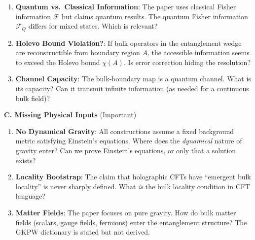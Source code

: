 \documentclass[12pt,a4paper]{article}
\begin{document}
\begin{tcolorbox}[colback=red!5!white, colframe=red!75!black, title=\textbf{RED TEAM Round 6: Foundational Critiques}]
\begin{enumerate}[resume, label=\textbf{R6.\arabic*.}]
    \item \textbf{Quantum vs.\ Classical Information}: The paper uses classical Fisher information $\mathcal{F}$ but claims quantum results. The quantum Fisher information $\mathcal{F}_Q$ differs for mixed states. Which is relevant?
    
    \item \textbf{Holevo Bound Violation?}: If bulk operators in the entanglement wedge are reconstructible from boundary region $A$, the accessible information seems to exceed the Holevo bound $\chi(A)$. Is error correction hiding the resolution?
    
    \item \textbf{Channel Capacity}: The bulk-boundary map is a quantum channel. What is its capacity? Can it transmit infinite information (as needed for a continuous bulk field)?
\end{enumerate}

\textbf{C. Missing Physical Inputs} (\textcolor{yellow!80!black}{Important})

\begin{enumerate}[resume, label=\textbf{R6.\arabic*.}]
    \item \textbf{No Dynamical Gravity}: All constructions assume a fixed background metric satisfying Einstein's equations. Where does the \emph{dynamical} nature of gravity enter? Can we prove Einstein's equations, or only that a solution exists?
    
    \item \textbf{Locality Bootstrap}: The claim that holographic CFTs have ``emergent bulk locality'' is never sharply defined. What \emph{is} the bulk locality condition in CFT language?
    
    \item \textbf{Matter Fields}: The paper focuses on pure gravity. How do bulk matter fields (scalars, gauge fields, fermions) enter the entanglement structure? The GKPW dictionary is stated but not derived.
\end{enumerate}

\end{tcolorbox}

\vspace{1em}
\end{document}
